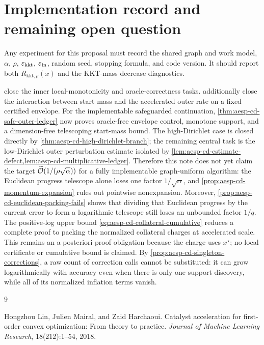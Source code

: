 \section{Implementation record and remaining open question}

Any experiment for this proposal must record the shared graph and work model,
$\alpha$, $\rho$, $\varepsilon_{\mathrm{kkt}}$, $\varepsilon_{\mathrm{in}}$, random seed, stopping formula, and code
version.  It should report both $R_{\mathrm{kkt},\rho}(x)$ and the KKT-mass
decrease diagnostics.

 close the
inner local-monotonicity and oracle-correctness tasks.
 additionally
close the interaction between start mass and the accelerated outer rate on a
fixed certified envelope.  For the implementable safeguarded continuation,
\cref{thm:aesp-cd-safe-outer-ledger} now proves oracle-free envelope control,
monotone support, and a dimension-free telescoping start-mass bound.  The
high-Dirichlet case is closed directly by
\cref{thm:aesp-cd-high-dirichlet-branch}; the remaining central task is the
low-Dirichlet outer perturbation estimate isolated by
\cref{lem:aesp-cd-estimate-defect,lem:aesp-cd-multiplicative-ledger}.
Therefore this note does not yet claim the target
$\widetilde{\mathcal{O}}(1/(\rho\sqrt\alpha))$ for a fully implementable graph-uniform
algorithm: the Euclidean progress telescope alone loses one factor
$1/\sqrt\alpha$, and \cref{prop:aesp-cd-momentum-expansion} rules out
pointwise nonexpansion.  Moreover,
\cref{prop:aesp-cd-euclidean-packing-fails} shows that dividing that
Euclidean progress by the current error to form a logarithmic telescope still
loses an unbounded factor $1/q$.  The positive-log upper bound
\cref{eq:aesp-cd-collateral-cumulative} reduces a complete proof to packing
the normalized collateral charges at accelerated scale.  This remains an
a posteriori proof obligation because the charge uses $x^\star$; no local
certificate or cumulative bound is claimed.  By
\cref{prop:aesp-cd-singleton-corrections}, a raw count of correction calls
cannot be substituted: it can grow logarithmically with accuracy even when
there is only one support discovery, while all of its normalized inflation
terms vanish.

\begin{thebibliography}{9}

Hongzhou Lin, Julien Mairal, and Zaid Harchaoui.
\newblock Catalyst acceleration for first-order convex optimization: From
theory to practice.
\newblock \emph{Journal of Machine Learning Research}, 18(212):1--54, 2018.

\end{thebibliography}
